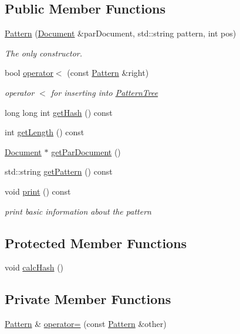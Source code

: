 \subsection*{Public Member Functions}
\begin{DoxyCompactItemize}
\item 
\hyperlink{class_pattern_ada73ecc1fc5e4d94f30a8161feef67cf}{Pattern} (\hyperlink{class_document}{Document} \&par\+Document, std\+::string pattern, int pos)
\begin{DoxyCompactList}\small\item\em The only constructor. \end{DoxyCompactList}\item 
bool \hyperlink{class_pattern_a157a34771b4c550a7cf528f09fa685b5}{operator$<$} (const \hyperlink{class_pattern}{Pattern} \&right)
\begin{DoxyCompactList}\small\item\em operator $<$ for inserting into \hyperlink{class_pattern_tree}{Pattern\+Tree} \end{DoxyCompactList}\item 
long long int \hyperlink{class_pattern_ab6c1a23c63162c8e9bc27061e9370ed1}{get\+Hash} () const 
\item 
int \hyperlink{class_pattern_a371d9dad975d97190b969ee6e77178c0}{get\+Length} () const 
\item 
\hyperlink{class_document}{Document} $\ast$ \hyperlink{class_pattern_aba85629c60347a4f3c81bd7088af4c55}{get\+Par\+Document} ()
\item 
std\+::string \hyperlink{class_pattern_ad4f3ad6d391eea8c6fd95efdf7f7246d}{get\+Pattern} () const 
\item 
void \hyperlink{class_pattern_a44a70e6aff49a25fa068487e3d9f0fa3}{print} () const 
\begin{DoxyCompactList}\small\item\em print basic information about the pattern \end{DoxyCompactList}\end{DoxyCompactItemize}
\subsection*{Protected Member Functions}
\begin{DoxyCompactItemize}
\item 
void \hyperlink{class_pattern_a8c7f0e27f620c00de00d097c84e9d6c3}{calc\+Hash} ()
\end{DoxyCompactItemize}
\subsection*{Private Member Functions}
\begin{DoxyCompactItemize}
\item 
\hyperlink{class_pattern}{Pattern} \& \hyperlink{class_pattern_a69f59394d218d0e476ef9259130e6bef}{operator=} (const \hyperlink{class_pattern}{Pattern} \&other)
\end{DoxyCompactItemize}
